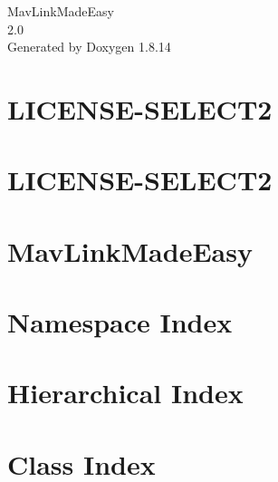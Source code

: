 \documentclass[twoside]{book}
\newcommand{\+}{\discretionary{\mbox{\scriptsize$\hookleftarrow$}}{}{}}
\newcommand{\clearemptydoublepage}{%
  \newpage{\pagestyle{empty}\cleardoublepage}%
}
\begin{document}
\hypersetup{pageanchor=false,
             bookmarksnumbered=true,
             pdfencoding=unicode
            }
\begin{titlepage}
\vspace*{7cm}
\begin{center}%
{\Large Mav\+Link\+Made\+Easy \\[1ex]\large 2.\+0 }\\
\vspace*{1cm}
{\large Generated by Doxygen 1.8.14}\\
\end{center}
\end{titlepage}
\clearemptydoublepage
{}
\tableofcontents
\clearemptydoublepage
{}
\hypersetup{pageanchor=true}

\chapter{L\+I\+C\+E\+N\+S\+E-\/\+S\+E\+L\+E\+C\+T2}
\label{md_mavAgenda_static_admin_css_vendor_select2_LICENSE-SELECT2}

\chapter{L\+I\+C\+E\+N\+S\+E-\/\+S\+E\+L\+E\+C\+T2}
\label{md_mavAgenda_static_admin_js_vendor_select2_LICENSE-SELECT2}

\chapter{Mav\+Link\+Made\+Easy}
\label{md_README}

\chapter{Namespace Index}

\chapter{Hierarchical Index}

\chapter{Class Index}

\end{document}
